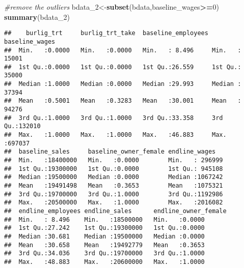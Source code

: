 \documentclass[]{article}
\newenvironment{Shaded}{\begin{snugshade}}{\end{snugshade}}
\newcommand{\CommentTok}[1]{\textcolor[rgb]{0.56,0.35,0.01}{\textit{#1}}}
\newcommand{\DecValTok}[1]{\textcolor[rgb]{0.00,0.00,0.81}{#1}}
\newcommand{\KeywordTok}[1]{\textcolor[rgb]{0.13,0.29,0.53}{\textbf{#1}}}
\newcommand{\NormalTok}[1]{#1}
\newcommand{\OperatorTok}[1]{\textcolor[rgb]{0.81,0.36,0.00}{\textbf{#1}}}
\begin{document}
\begin{Shaded}
\begin{Highlighting}[]
\CommentTok{#remove the outliers}
\NormalTok{bdata_}\DecValTok{2}\NormalTok{<-}\KeywordTok{subset}\NormalTok{(bdata,baseline_wages}\OperatorTok{>=}\DecValTok{0}\NormalTok{)}
\KeywordTok{summary}\NormalTok{(bdata_}\DecValTok{2}\NormalTok{)}
\end{Highlighting}
\end{Shaded}

\begin{verbatim}
##    burlig_trt     burlig_trt_take  baseline_employees baseline_wages  
##  Min.   :0.0000   Min.   :0.0000   Min.   : 8.496     Min.   : 15001  
##  1st Qu.:0.0000   1st Qu.:0.0000   1st Qu.:26.559     1st Qu.: 35000  
##  Median :1.0000   Median :0.0000   Median :29.993     Median : 37394  
##  Mean   :0.5001   Mean   :0.3283   Mean   :30.001     Mean   : 94276  
##  3rd Qu.:1.0000   3rd Qu.:1.0000   3rd Qu.:33.358     3rd Qu.:132010  
##  Max.   :1.0000   Max.   :1.0000   Max.   :46.883     Max.   :697037  
##  baseline_sales     baseline_owner_female endline_wages    
##  Min.   :18400000   Min.   :0.0000        Min.   : 296999  
##  1st Qu.:19300000   1st Qu.:0.0000        1st Qu.: 945108  
##  Median :19500000   Median :0.0000        Median :1067242  
##  Mean   :19491498   Mean   :0.3653        Mean   :1075321  
##  3rd Qu.:19700000   3rd Qu.:1.0000        3rd Qu.:1192986  
##  Max.   :20500000   Max.   :1.0000        Max.   :2016082  
##  endline_employees endline_sales      endline_owner_female
##  Min.   : 8.496    Min.   :18500000   Min.   :0.0000      
##  1st Qu.:27.242    1st Qu.:19300000   1st Qu.:0.0000      
##  Median :30.681    Median :19500000   Median :0.0000      
##  Mean   :30.658    Mean   :19492779   Mean   :0.3653      
##  3rd Qu.:34.036    3rd Qu.:19700000   3rd Qu.:1.0000      
##  Max.   :48.883    Max.   :20600000   Max.   :1.0000
\end{verbatim}
\end{document}
